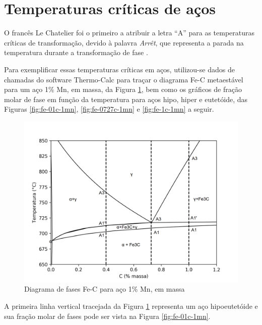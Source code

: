 \documentclass[brazil,tf,epusp]{usp}  %
\begin{document}
\section{Temperaturas cr\'iticas de aços}

O francês Le Chatelier foi o primeiro a atribuir a letra ``A'' para as temperaturas críticas de transformação, devido à palavra \textit{Arrêt}, que representa a parada na temperatura durante a transformação de fase \cite{Silva2010}.

Para exemplificar essas temperaturas críticas em aços, utilizou-se dados de chamadas do software Thermo-Calc\textregistered{} para traçar o diagrama Fe-C metaestável para um aço 1\% Mn, em massa, da Figura \ref{fig:fe-1mn-C_isopleth}, bem como os gráficos de fração molar de fase em função da temperatura para aços hipo, hiper e eutetóide, das Figuras \ref{fig:fe-01c-1mn}, \ref{fig:fe-0727c-1mn} e \ref{fig:fe-1c-1mn} a seguir.

\begin{figure}[ht!]
  \includegraphics[width=.9\textwidth]{img/Fe-1Mn-C_isopleth_edited.png}
  \caption{Diagrama de fases Fe-C para aço 1\% Mn, em massa}
  \label{fig:fe-1mn-C_isopleth}
\end{figure}

A primeira linha vertical tracejada da Figura \ref{fig:fe-1mn-C_isopleth} representa um aço hipoeutetóide e sua fração molar de fases pode ser vista na Figura \ref{fig:fe-01c-1mn}.
\end{document}
